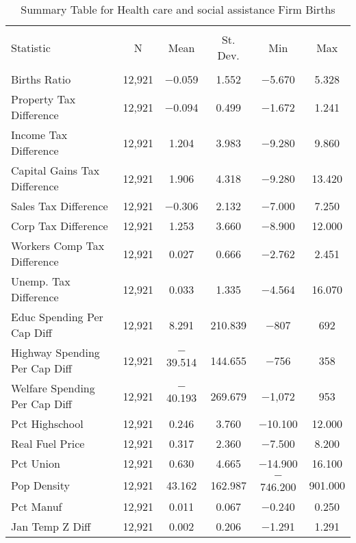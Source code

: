 
\begin{table}[!htbp] \centering 
  \caption{Summary Table for  Health care and social assistance Firm Births} 
  \label{62summary} 
\begin{tabular}{@{\extracolsep{5pt}}lccccc} 
\\[-1.8ex]\hline 
\hline \\[-1.8ex] 
Statistic & \multicolumn{1}{c}{N} & \multicolumn{1}{c}{Mean} & \multicolumn{1}{c}{St. Dev.} & \multicolumn{1}{c}{Min} & \multicolumn{1}{c}{Max} \\ 
\hline \\[-1.8ex] 
Births Ratio & 12,921 & $-$0.059 & 1.552 & $-$5.670 & 5.328 \\ 
Property Tax Difference & 12,921 & $-$0.094 & 0.499 & $-$1.672 & 1.241 \\ 
Income Tax Difference & 12,921 & 1.204 & 3.983 & $-$9.280 & 9.860 \\ 
Capital Gains Tax Difference & 12,921 & 1.906 & 4.318 & $-$9.280 & 13.420 \\ 
Sales Tax Difference & 12,921 & $-$0.306 & 2.132 & $-$7.000 & 7.250 \\ 
Corp Tax Difference & 12,921 & 1.253 & 3.660 & $-$8.900 & 12.000 \\ 
Workers Comp Tax Difference & 12,921 & 0.027 & 0.666 & $-$2.762 & 2.451 \\ 
Unemp. Tax Difference & 12,921 & 0.033 & 1.335 & $-$4.564 & 16.070 \\ 
Educ Spending Per Cap Diff & 12,921 & 8.291 & 210.839 & $-$807 & 692 \\ 
Highway Spending Per Cap Diff & 12,921 & $-$39.514 & 144.655 & $-$756 & 358 \\ 
Welfare Spending Per Cap Diff & 12,921 & $-$40.193 & 269.679 & $-$1,072 & 953 \\ 
Pct Highschool & 12,921 & 0.246 & 3.760 & $-$10.100 & 12.000 \\ 
Real Fuel Price & 12,921 & 0.317 & 2.360 & $-$7.500 & 8.200 \\ 
Pct Union & 12,921 & 0.630 & 4.665 & $-$14.900 & 16.100 \\ 
Pop Density & 12,921 & 43.162 & 162.987 & $-$746.200 & 901.000 \\ 
Pct Manuf & 12,921 & 0.011 & 0.067 & $-$0.240 & 0.250 \\ 
Jan Temp Z Diff & 12,921 & 0.002 & 0.206 & $-$1.291 & 1.291 \\ 

\end{tabular}
\end{table}
